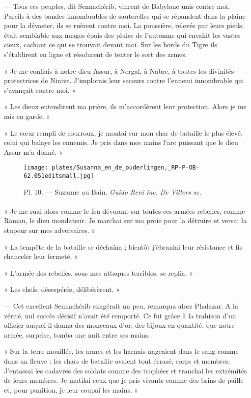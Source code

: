 \documentclass[a4paper, 11pt, oneside, polutonikogreek, french]{article}
\begin{document}
--- Tous ces peuples, dit Sennachérib, vinrent de Babylone unis contre moi. Pareils à des bandes innombrables de sauterelles qui se répandent dans la plaine pour la dévaster, ils se ruèrent contre moi. La poussière, relevée par leurs pieds, était semblable aux nuages épais des pluies de l'automne qui envahit les vastes cieux, cachant ce qui se trouvait devant moi. Sur les bords du Tigre ils s'établirent en ligne et résolurent de tenter le sort des armes.

« Je me confiais à notre dieu Assur, à Nergal, à Nabre, à toutes les divinités protectrices de Ninive. J'implorais leur secours contre l'ennemi innombrable qui s'avançait contre moi. »

« Les dieux entendirent ma prière, ils m'accordèrent leur protection. Alors je me mis en garde. »

« Le cœur rempli de courroux, je montai sur mon char de bataille le plus élevé, celui qui balaye les ennemis. Je pris dans mes mains l'arc puissant que le dieu Assur m'a donné. »
\clearpage
\begin{landscape}
\begin{figure}[H]
\centering
\texttt{[image: plates/Susanna\_en\_de\_ouderlingen,\_RP-P-OB-62.051editsmall.jpg]}
\caption{Pl. 10. --- Suzanne au Bain. \emph{Guido Reni inc.} \emph{De Villers sc.}}
\end{figure}
\end{landscape}
\clearpage
\paragraph{}
« Je me ruai alors comme le feu dévorant sur toutes ces armées rebelles, comme Raman, le dieu inondateur. Je marchai sur ma proie pour la détruire et versai la stupeur sur mes adversaires. »

« La tempête de la bataille se déchaîna ; bientôt j'ébranlai leur résistance et fis chanceler leur fermeté. »

« L'armée des rebelles, sous mes attaques terribles, se replia. »

« Les chefs, désespérés, délibérèrent. »

--- Cet excellent Sennachérib exagérait un peu, remarqua alors Phalazar. A la vérité, nul succès décisif n'avait été remporté. Ce fut grâce à la trahison d'un officier auquel il donna des monceaux d'or, des bijoux en quantité, que notre armée, surprise, tomba une nuit entre ses mains.

« Sur la terre mouillée, les armes et les harnais nageaient dans le sang comme dans un fleuve : les chars de bataille avaient tout écrasé, corps et membres. J'entassai les cadavres des soldats comme des trophées et tranchai les extrémités de leurs membres. Je mutilai ceux que je pris vivants comme des brins de paille et, pour punition, je leur coupai les mains. »
\end{document}
